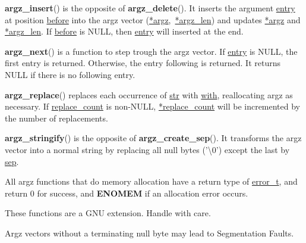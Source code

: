 \documentclass[]{article}
\let\realtextbf=\textbf
\renewcommand{\textbf}[1]{\textcolor{boldcolor}{\realtextbf{#1}}}
\renewcommand{\emph}[1]{\underline{#1}}
\begin{document}
\textbf{argz\_insert}() is the opposite of \textbf{argz\_delete}(). It
inserts the argument \emph{entry} at position \emph{before} into the
argz vector (\emph{*argz},~\emph{*argz\_len}) and updates \emph{*argz}
and \emph{*argz\_len}. If \emph{before} is NULL, then \emph{entry} will
inserted at the end.

\textbf{argz\_next}() is a function to step trough the argz vector. If
\emph{entry} is NULL, the first entry is returned. Otherwise, the entry
following is returned. It returns NULL if there is no following entry.

\textbf{argz\_replace}() replaces each occurrence of \emph{str} with
\emph{with}, reallocating argz as necessary. If \emph{replace\_count} is
non-NULL, \emph{*replace\_count} will be incremented by the number of
replacements.

\textbf{argz\_stringify}() is the opposite of
\textbf{argz\_create\_sep}(). It transforms the argz vector into a
normal string by replacing all null bytes ('\textbackslash{}0') except
the last by \emph{sep}.


All argz functions that do memory allocation have a return type of
\emph{error\_t}, and return 0 for success, and \textbf{ENOMEM} if an
allocation error occurs.


These functions are a GNU extension. Handle with care.


Argz vectors without a terminating null byte may lead to Segmentation
Faults.

\end{document}
